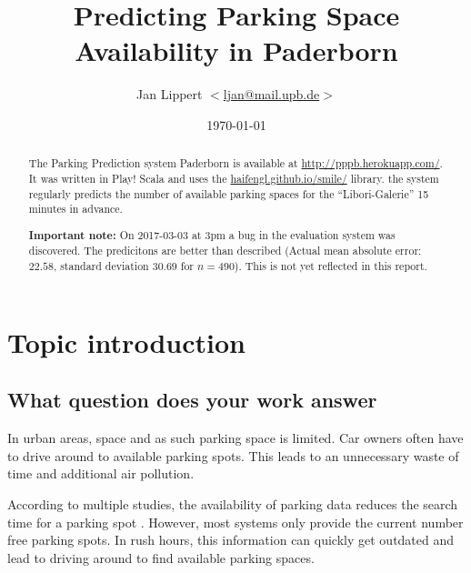 \documentclass[journal,10pt]{IEEEtran}
\author{Jan Lippert \(<\)\href{mailto:ljan@mail.upb.de}{ljan@mail.upb.de}\(>\)}
\date{\today}
\begin{document}
\title{Predicting Parking Space Availability in Paderborn}
\maketitle

\begin{abstract}
The Parking Prediction system Paderborn is available at \url{http://pppb.herokuapp.com/}. It was written in Play! Scala and uses the \href{smile}{haifengl.github.io/smile/} library. the system regularly predicts the number of available parking spaces for the ``Libori-Galerie'' 15 minutes in advance.

\textbf{Important note:} On 2017-03-03 at 3pm a bug in the evaluation system was discovered. The predicitons are better than described (Actual mean absolute error: \(22.58\), standard deviation \(30.69\) for \(n = 490\)). This is not yet reflected in this report. 
\end{abstract}

\section{Topic introduction}

\subsection{What question does your work answer}
In urban areas, space and as such parking space is limited. Car owners often have to drive around to available parking spots. This leads to an unnecessary waste of time and additional air pollution. 

According to multiple studies, the availability of parking data reduces the search time for a parking spot \cite{Asakura1994}\cite{Caicedo2010228}. However, most systems only provide the current number free parking spots. In rush hours, this information can quickly get outdated and lead to driving around to find available parking spaces.

\end{document}
